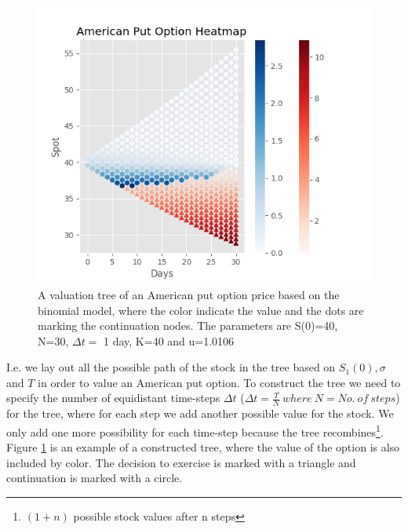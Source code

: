 \begin{figure}[th]
\centering
\includegraphics{Figures/BinomialTree.png}
\decoRule
\caption[Binomial Tree]{A valuation tree of an American put option price based on the binomial model, where the color indicate the value and the dots are marking the continuation nodes. The parameters are S(0)=40, N=30, $\Delta t =$ 1 day, K=40 and u=1.0106}
\label{fig:BinomialTree}
\end{figure}

I.e. we lay out all the possible path of the stock in the tree based on $S_1(0),\sigma$ and $T$ in order to value an American put option. To construct the tree we need to specify the number of equidistant time-steps $\Delta t$ ($\Delta t = \frac{T}{N} \ where \ N=No. \ of  \ steps$) for the tree, where for each step we add another possible value for the stock. We only add one more possibility for each time-step because the tree recombines\footnote{$(1+n)$ possible stock values after n steps}. Figure \ref{fig:BinomialTree} is an example of a constructed tree, where the value of the option is also included by color. The decision to exercise is marked with a triangle and continuation is marked with a circle. \\

